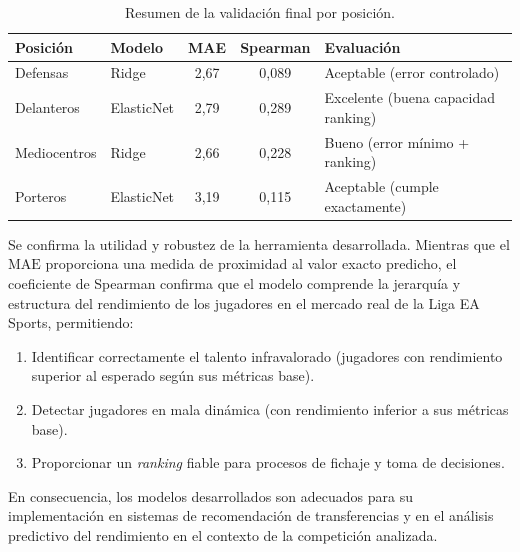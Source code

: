 \begin{table}[H]
\centering
\small
\begin{tabular}{|l|l|c|c|p{4.2cm}|}
\hline
\textbf{Posición} & \textbf{Modelo} & \textbf{MAE} &
\textbf{Spearman} & \textbf{Evaluación} \\
\hline
Defensas     & Ridge      & 2{,}67 & 0{,}089 &
  Aceptable (error controlado)        \\
Delanteros   & ElasticNet & 2{,}79 & 0{,}289 &
  Excelente (buena capacidad ranking)  \\
Mediocentros & Ridge      & 2{,}66 & 0{,}228 &
  Bueno (error mínimo + ranking)      \\
Porteros     & ElasticNet & 3{,}19 & 0{,}115 &
  Aceptable (cumple exactamente)      \\
\hline
\end{tabular}
\caption{Resumen de la validación final por posición.}
\label{tab:resumen_validacion}
\end{table}

Se confirma la utilidad y robustez de la herramienta desarrollada.
Mientras que el $\mathrm{MAE}$ proporciona una medida de proximidad al
valor exacto predicho, el coeficiente de Spearman confirma que el modelo
comprende la jerarquía y estructura del rendimiento de los jugadores en
el mercado real de la Liga EA Sports, permitiendo:

\begin{enumerate}
  \item Identificar correctamente el talento infravalorado (jugadores
        con rendimiento superior al esperado según sus métricas base).
  \item Detectar jugadores en mala dinámica (con rendimiento inferior a
        sus métricas base).
  \item Proporcionar un \textit{ranking} fiable para procesos de
        fichaje y toma de decisiones.
\end{enumerate}

En consecuencia, los modelos desarrollados son adecuados para su
implementación en sistemas de recomendación de transferencias y en el
análisis predictivo del rendimiento en el contexto de la competición
analizada.
